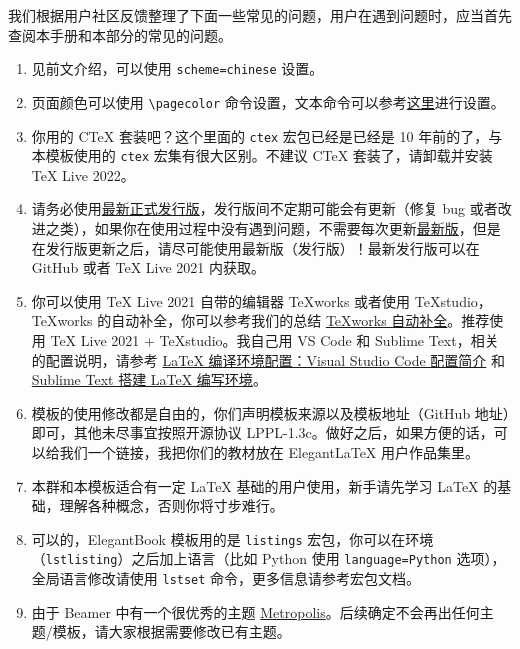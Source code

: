 \documentclass[lang=cn,newtx,10pt,scheme=chinese]{elegantbook}
\begin{document}
我们根据用户社区反馈整理了下面一些常见的问题，用户在遇到问题时，应当首先查阅本手册和本部分的常见的问题。

\begin{enumerate}[itemsep=1.5ex]
  \item {}
    见前文介绍，可以使用 \lstinline{scheme=chinese} 设置。
  \item {}
    页面颜色可以使用 \lstinline{\pagecolor} 命令设置，文本命令可以参考\href{https://tex.stackexchange.com/questions/278544/xcolor-what-is-the-equivalent-of-default-text-color}{这里}进行设置。
  \item {}
    你用的 C\TeX{} 套装吧？这个里面的 \lstinline{ctex} 宏包已经是已经是 10 年前的了，与本模板使用的 \lstinline{ctex} 宏集有很大区别。不建议 C\TeX{} 套装了，请卸载并安装 \TeX{} Live 2022。
  \item {}
    请务必使用\href{https://github.com/ElegantLaTeX/ElegantBook/releases}{最新正式发行版}，发行版间不定期可能会有更新（修复 bug 或者改进之类），如果你在使用过程中没有遇到问题，不需要每次更新\href{https://github.com/ElegantLaTeX/ElegantBook/archive/master.zip}{最新版}，但是在发行版更新之后，请尽可能使用最新版（发行版）！最新发行版可以在 GitHub 或者 \TeX{} Live 2021 内获取。
  \item {}
    你可以使用 \TeX{} Live 2021 自带的编辑器 \TeX{}works 或者使用 \TeX{}studio，\TeX works 的自动补全，你可以参考我们的总结 \href{https://github.com/EthanDeng/texworks-autocomplete}{\TeX works 自动补全}。推荐使用 \TeX{} Live 2021 + \TeX{}studio。我自己用 VS Code 和 Sublime Text，相关的配置说明，请参考 \href{https://github.com/EthanDeng/vscode-latex}{\LaTeX{} 编译环境配置：Visual Studio Code 配置简介} 和 \href{https://github.com/EthanDeng/sublime-text-latex}{Sublime Text 搭建 \LaTeX{} 编写环境}。
  \item {}
    模板的使用修改都是自由的，你们声明模板来源以及模板地址（GitHub 地址）即可，其他未尽事宜按照开源协议 LPPL-1.3c。做好之后，如果方便的话，可以给我们一个链接，我把你们的教材放在 Elegant\LaTeX{} 用户作品集里。
  \item {}
    本群和本模板适合有一定 \LaTeX{} 基础的用户使用，新手请先学习 \LaTeX{} 的基础，理解各种概念，否则你将寸步难行。
  \item {}
    可以的，ElegantBook 模板用的是 \lstinline{listings} 宏包，你可以在环境（\lstinline{lstlisting}）之后加上语言（比如 Python 使用 \lstinline{language=Python} 选项），全局语言修改请使用 \lstinline{lstset} 命令，更多信息请参考宏包文档。
  \item {}
    由于 Beamer 中有一个很优秀的主题 \href{https://github.com/matze/mtheme}{Metropolis}。后续确定不会再出任何主题/模板，请大家根据需要修改已有主题。
\end{enumerate}
\end{document}
